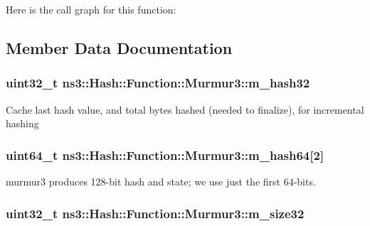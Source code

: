 Here is the call graph for this function\+:




\subsection{Member Data Documentation}
\subsubsection[{\texorpdfstring{m\+\_\+hash32}{m_hash32}}]{\setlength{\rightskip}{0pt plus 5cm}uint32\+\_\+t ns3\+::\+Hash\+::\+Function\+::\+Murmur3\+::m\+\_\+hash32\hspace{0.3cm}{\ttfamily [private]}}\hypertarget{classns3_1_1Hash_1_1Function_1_1Murmur3_a8a54e5cd90d08a8bd8f92d7f6a982e3f}{}\label{classns3_1_1Hash_1_1Function_1_1Murmur3_a8a54e5cd90d08a8bd8f92d7f6a982e3f}
Cache last hash value, and total bytes hashed (needed to finalize), for incremental hashing 
\subsubsection[{\texorpdfstring{m\+\_\+hash64}{m_hash64}}]{\setlength{\rightskip}{0pt plus 5cm}uint64\+\_\+t ns3\+::\+Hash\+::\+Function\+::\+Murmur3\+::m\+\_\+hash64\mbox{[}2\mbox{]}\hspace{0.3cm}{\ttfamily [private]}}\hypertarget{classns3_1_1Hash_1_1Function_1_1Murmur3_a4f75089450577248e7da181266561d6e}{}\label{classns3_1_1Hash_1_1Function_1_1Murmur3_a4f75089450577248e7da181266561d6e}
murmur3 produces 128-\/bit hash and state; we use just the first 64-\/bits. 
\subsubsection[{\texorpdfstring{m\+\_\+size32}{m_size32}}]{\setlength{\rightskip}{0pt plus 5cm}uint32\+\_\+t ns3\+::\+Hash\+::\+Function\+::\+Murmur3\+::m\+\_\+size32\hspace{0.3cm}{\ttfamily [private]}}\hypertarget{classns3_1_1Hash_1_1Function_1_1Murmur3_a37952f402444600e609ed34001be29d9}{}\label{classns3_1_1Hash_1_1Function_1_1Murmur3_a37952f402444600e609ed34001be29d9}
